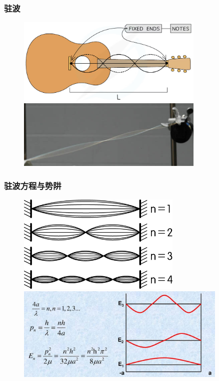 {\frame
{
	\frametitle{\textrm{驻波}}
\begin{figure}[h!]
\centering
\vspace{-15.5pt}
\includegraphics[height=0.40\textwidth,width=0.8\textwidth,viewport=0 0 900 450,clip]{Figures/Guitar-string.png}
\vskip 0.1pt
\includegraphics[height=0.35\textwidth,width=0.8\textwidth,viewport=0 0 122 48,clip]{Figures/string-standing-wave.jpg}
\label{Standing_Wave_0}
\end{figure}
}

\frame
{
	\frametitle{驻波方程与势阱}
\begin{figure}[h!]
\centering
\vspace{-12.5pt}
\includegraphics[height=0.32\textwidth,width=0.7\textwidth,viewport=0 0 125 75,clip]{Figures/Standing_wave.jpeg}
\vskip 2pt
\includegraphics[height=0.40\textwidth,width=0.9\textwidth,viewport=0 0 1200 550,clip]{Figures/Standing_wave-energy.jpg}
\label{Standing_Wave_1}
\end{figure}
}

}
